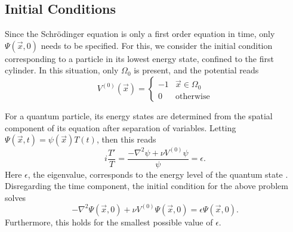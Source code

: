 \documentclass[../../main.tex]{subfiles}
\begin{document}
\subsection{Initial Conditions}

Since the Schr\"odinger equation is only a first order equation in time,
only $\Psi(\vec x, 0)$ needs to be specified.  
For this, we consider the initial condition corresponding to 
a particle in its lowest energy state, confined to the first cylinder.  
In this situation, only $\Omega_0$ is present, and the potential reads
\begin{equation}
		\label{eq:potential-one-cylinder}
		V^{(0)}(\vec x) = 
		\begin{cases}
				-1 & \vec x \in \Omega_0 \\
				0 & \text{otherwise}
		\end{cases}
\end{equation}

For a quantum particle, its energy states are determined from 
the spatial component of its equation after separation of variables.
Letting $\Psi(\vec x, t) = \psi(\vec x) T(t)$, then this reads
\[
		i \frac{T'}{T} = \frac{-\nabla^2 \psi + \nu V^{(0)} \psi}{\psi} 
		= \epsilon
.\] 
Here $\epsilon$, the eigenvalue, corresponds to 
the energy level of the quantum state \cite{griffiths-quantum}.
Disregarding the time component,
the initial condition for the above problem
solves
\begin{equation}
		\label{eq:init-cond-requirement}
		-\nabla^2 \Psi(\vec x, 0) + \nu V^{(0)} \Psi(\vec x, 0) = 
		\epsilon \Psi(\vec x, 0)
.\end{equation}
Furthermore, this holds for the smallest possible value of 
$\epsilon$.  
\end{document}
